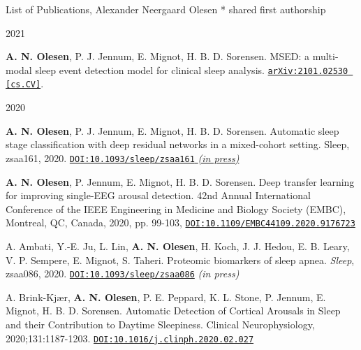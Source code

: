 \documentclass{resume} %
\begin{document}
\begin{rSection}{List of Publications, Alexander Neergaard Olesen}
	\medskip
    \mbox{*} shared first authorship
    
    \begin{rSubsection}{2021}{}{}{}
        \item \textbf{A. N. Olesen}, P. J. Jennum, E. Mignot, H. B. D. Sorensen. MSED: a multi-modal sleep event detection model for clinical sleep analysis. \href{https://arxiv.org/abs/2101.02530}{\texttt{arXiv:2101.02530 [cs.CV]}}.
    \end{rSubsection}
    
    \begin{rSubsection}{2020}{}{}{}
        \item \textbf{A. N. Olesen}, P. J. Jennum, E. Mignot, H. B. D. Sorensen. Automatic sleep stage classification with deep residual networks in a mixed-cohort setting. Sleep, zsaa161, 2020. \href{https://doi.org/10.1093/sleep/zsaa161}{\texttt{DOI:10.1093/sleep/zsaa161} \textit{(in press)}} \medskip
        
        \item \textbf{A. N. Olesen}, P. Jennum, E. Mignot, H. B. D. Sorensen. Deep transfer learning for improving single-EEG arousal detection. 42nd Annual International Conference of the IEEE Engineering in Medicine and Biology Society (EMBC), Montreal, QC, Canada, 2020, pp. 99-103, \href{https://doi.org/10.1109/EMBC44109.2020.9176723}{\texttt{DOI:10.1109/EMBC44109.2020.9176723}} \medskip
        
        \item A. Ambati, Y.-E. Ju, L. Lin, \textbf{A. N. Olesen}, H. Koch, J. J. Hedou, E. B. Leary, V. P. Sempere, E. Mignot, S. Taheri. Proteomic biomarkers of sleep apnea. \textit{Sleep}, zsaa086, 2020. \href{https://doi.org/10.1093/sleep/zsaa086}{\texttt{DOI:10.1093/sleep/zsaa086}} \textit{(in press)} \medskip
        
        \item A. Brink-Kjær, \textbf{A. N. Olesen}, P. E. Peppard, K. L. Stone, P. Jennum, E. Mignot, H. B. D. Sorensen. Automatic Detection of Cortical Arousals in Sleep and their Contribution to Daytime Sleepiness. Clinical Neurophysiology, 2020;131:1187-1203. \href{https://doi.org/10.1016/j.clinph.2020.02.027}{\texttt{DOI:10.1016/j.clinph.2020.02.027}} \medskip
	    

\end{rSubsection}
\end{rSection}
\end{document}
